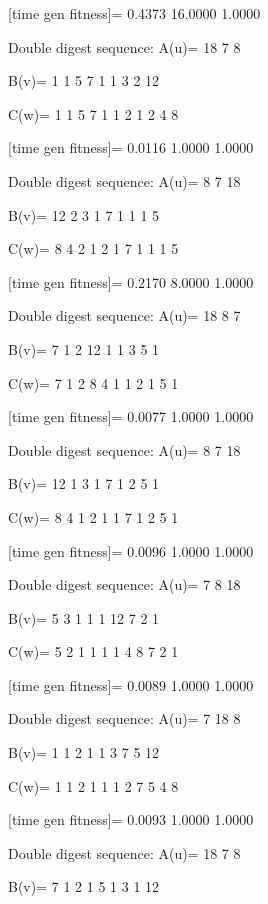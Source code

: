 [time gen fitness]=
    0.4373   16.0000    1.0000

Double digest sequence:
A(u)=
    18     7     8

B(v)=
     1     1     5     7     1     1     3     2    12

C(w)=
     1     1     5     7     1     1     2     1     2     4     8

[time gen fitness]=
    0.0116    1.0000    1.0000

Double digest sequence:
A(u)=
     8     7    18

B(v)=
    12     2     3     1     7     1     1     1     5

C(w)=
     8     4     2     1     2     1     7     1     1     1     5

[time gen fitness]=
    0.2170    8.0000    1.0000

Double digest sequence:
A(u)=
    18     8     7

B(v)=
     7     1     2    12     1     1     3     5     1

C(w)=
     7     1     2     8     4     1     1     2     1     5     1

[time gen fitness]=
    0.0077    1.0000    1.0000

Double digest sequence:
A(u)=
     8     7    18

B(v)=
    12     1     3     1     7     1     2     5     1

C(w)=
     8     4     1     2     1     1     7     1     2     5     1

[time gen fitness]=
    0.0096    1.0000    1.0000

Double digest sequence:
A(u)=
     7     8    18

B(v)=
     5     3     1     1     1    12     7     2     1

C(w)=
     5     2     1     1     1     1     4     8     7     2     1

[time gen fitness]=
    0.0089    1.0000    1.0000

Double digest sequence:
A(u)=
     7    18     8

B(v)=
     1     1     2     1     1     3     7     5    12

C(w)=
     1     1     2     1     1     1     2     7     5     4     8

[time gen fitness]=
    0.0093    1.0000    1.0000

Double digest sequence:
A(u)=
    18     7     8

B(v)=
     7     1     2     1     5     1     3     1    12

